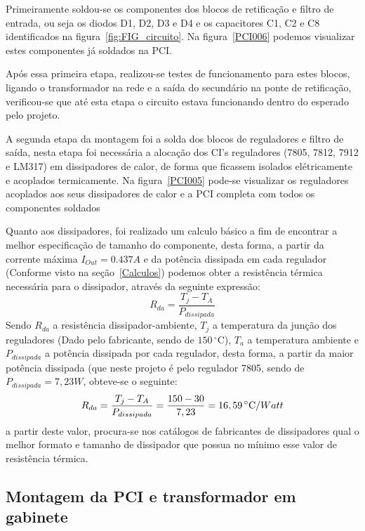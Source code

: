 \documentclass[
	article,			%
	11pt,				%
	oneside,			%
	a4paper,			%
	english,			%
	brazil,				%
	sumario=tradicional
	]{abntex2}
\begin{document}
Primeiramente soldou-se os componentes dos blocos de retificação e filtro de entrada, ou seja os diodos D1, D2, D3 e D4 e os capacitores C1, C2 e C8 identificados na figura~\ref{fig:FIG_circuito}. Na figura~\ref{PCI006} podemos visualizar estes componentes já soldados na PCI.

Após essa primeira etapa, realizou-se testes de funcionamento para estes blocos, ligando o transformador na rede e a saída do secundário na ponte de retificação, verificou-se que até esta etapa o circuito estava funcionando dentro do esperado pelo projeto.

A segunda etapa da montagem foi a solda dos blocos de reguladores e filtro de saída, nesta etapa foi necessária a alocação dos CI's reguladores (7805, 7812, 7912 e LM317) em dissipadores de calor, de forma que ficassem isolados elétricamente e acoplados termicamente. Na figura~\ref{PCI005} pode-se visualizar os reguladores acoplados aos seus dissipadores de calor e a PCI completa com todos os componentes soldados

Quanto aos dissipadores, foi realizado um calculo básico a fim de encontrar a melhor especificação de tamanho do componente, desta forma, a partir da corrente máxima $I_{Out} = 0.437A$ e da potência dissipada em cada regulador (Conforme visto na seção~\ref{Calculos}) podemos obter a resistência térmica necessária para o dissipador, através da seguinte expressão:
\begin{equation}
R_{da} = \frac{T_j - T_A}{P_{dissipada}}
\end{equation}
Sendo $R_{da}$ a resistência dissipador-ambiente, $T_j$ a temperatura da junção dos reguladores (Dado pelo fabricante, sendo de $150\,^{\circ}\mathrm{C}$), $T_a$ a temperatura ambiente e $P_{dissipada}$ a potência dissipada por cada regulador, desta forma, a partir da maior potência dissipada (que neste projeto é pelo regulador 7805, sendo de $P_{dissipada} = 7,23W$, obteve-se o seguinte:
$$
R_{da} = \frac{T_j - T_A}{P_{dissipada}}\nonumber\\
= \frac{150 - 30}{7,23}\nonumber\\
= 16,59\,^{\circ}\mathrm{C}/Watt
$$
a partir deste valor, procura-se nos catálogos de fabricantes de dissipadores qual o melhor formato e tamanho de dissipador que possua no mínimo esse valor de resistência térmica.


\subsection{Montagem da PCI e transformador em gabinete}
\end{document}
